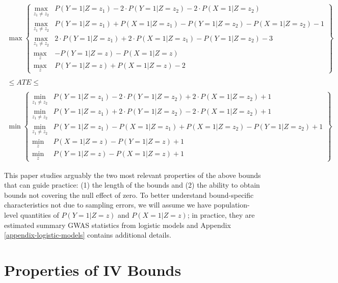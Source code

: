 \documentclass[
]{article}
\theoremstyle{plain}
\begin{document}
\begin{gather}
\max \left \{
\begin{array}{ll}
  \max_{z_1 \neq z_2} & P(Y = 1 | Z = z_1) - 2\cdot P(Y = 1 | Z = z_2) - 2\cdot P(X = 1 | Z = z_2) \\
  \max_{z_1 \neq z_2} & P(Y = 1 | Z = z_1) + P(X = 1 | Z = z_1) - P(Y = 1 | Z = z_2) - P(X = 1 | Z = z_2) - 1 \\
  \max_{z_1 \neq z_2} & 2\cdot P(Y = 1 | Z = z_1) + 2\cdot P(X = 1 | Z = z_1) - P(Y = 1 | Z = z_2) - 3 \\
  \max_z & -P(Y = 1 | Z = z) - P(X = 1 | Z = z) \\
  \max_z & P(Y = 1 | Z = z) +  P(X = 1 | Z = z) - 2
\end{array}
\right \} \nonumber \\ \nonumber \\
\le ATE \le \label{eq:ate_bound} \\ \nonumber \\
\min \left \{
\begin{array}{ll}
  \min_{z_1 \neq z_2} & P(Y = 1 | Z = z_1) - 2\cdot P(Y = 1 | Z = z_2) +  2\cdot P(X = 1 | Z = z_2) + 1 \\
  \min_{z_1 \neq z_2} & P(Y = 1 | Z = z_1) + 2\cdot P(Y = 1 | Z = z_2) -  2\cdot P(X = 1 | Z = z_2) + 1 \\
  \min_{z_1 \neq z_2} & P(Y = 1 | Z = z_1) - P(X = 1 | Z = z_1) + P(X = 1 | Z = z_2) - P(Y = 1 | Z = z_2) + 1 \\
  \min_z & P(X = 1 | Z = z) - P(Y = 1 | Z = z) + 1 \\
  \min_z & P(Y = 1 | Z = z) - P(X = 1 | Z = z) + 1 
\end{array} 
\right \} \nonumber
\end{gather}

This paper studies arguably the two most relevant properties of the above bounds that can guide practice: (1) the length of the bounds and (2) the ability to obtain bounds not covering the null effect of zero. To better understand bound-specific characteristics not due to sampling errors, we will assume we have population-level quantities of \(P(Y = 1 | Z = z)\) and \(P(X = 1 | Z = z)\); in practice, they are estimated summary GWAS statistics from logistic models \autocite{lawlor_mendelian_2008,burgess_sample_2014,verma_simulation_2018,millard_mr-phewas_2019,king_mendelian_2020} and Appendix \ref{appendix-logistic-models} contains additional details.

\hypertarget{properties-of-iv-bounds}{%
\section{Properties of IV Bounds}\label{properties-of-iv-bounds}}
\end{document}

